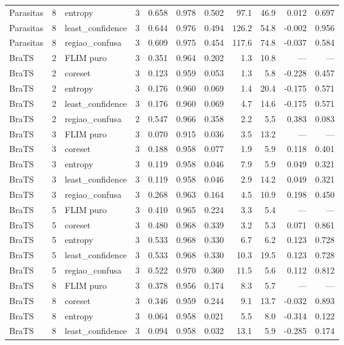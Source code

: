 \begin{tabular}{lllrrrrrrrr}
Parasitas & 8 & entropy & 3 & 0.658 & 0.978 & 0.502 & 97.1 & 46.9 & 0.012 & 0.697 \\
Parasitas & 8 & least\_confidence & 3 & 0.644 & 0.976 & 0.494 & 126.2 & 54.8 & -0.002 & 0.956 \\
Parasitas & 8 & regiao\_confusa & 3 & 0.609 & 0.975 & 0.454 & 117.6 & 74.8 & -0.037 & 0.584 \\
BraTS & 2 & FLIM puro & 3 & 0.351 & 0.964 & 0.202 & 1.3 & 10.8 & — & — \\
BraTS & 2 & coreset & 3 & 0.123 & 0.959 & 0.053 & 1.3 & 5.8 & -0.228 & 0.457 \\
BraTS & 2 & entropy & 3 & 0.176 & 0.960 & 0.069 & 1.4 & 20.4 & -0.175 & 0.571 \\
BraTS & 2 & least\_confidence & 3 & 0.176 & 0.960 & 0.069 & 4.7 & 14.6 & -0.175 & 0.571 \\
BraTS & 2 & regiao\_confusa & 2 & 0.547 & 0.966 & 0.358 & 2.2 & 5.5 & 0.383 & 0.083 \\
BraTS & 3 & FLIM puro & 3 & 0.070 & 0.915 & 0.036 & 3.5 & 13.2 & — & — \\
BraTS & 3 & coreset & 3 & 0.188 & 0.958 & 0.077 & 1.9 & 5.9 & 0.118 & 0.401 \\
BraTS & 3 & entropy & 3 & 0.119 & 0.958 & 0.046 & 7.9 & 5.9 & 0.049 & 0.321 \\
BraTS & 3 & least\_confidence & 3 & 0.119 & 0.958 & 0.046 & 2.9 & 14.2 & 0.049 & 0.321 \\
BraTS & 3 & regiao\_confusa & 3 & 0.268 & 0.963 & 0.164 & 4.5 & 10.9 & 0.198 & 0.450 \\
BraTS & 5 & FLIM puro & 3 & 0.410 & 0.965 & 0.224 & 3.3 & 5.4 & — & — \\
BraTS & 5 & coreset & 3 & 0.480 & 0.968 & 0.339 & 3.2 & 5.3 & 0.071 & 0.861 \\
BraTS & 5 & entropy & 3 & 0.533 & 0.968 & 0.330 & 6.7 & 6.2 & 0.123 & 0.728 \\
BraTS & 5 & least\_confidence & 3 & 0.533 & 0.968 & 0.330 & 10.3 & 19.5 & 0.123 & 0.728 \\
BraTS & 5 & regiao\_confusa & 3 & 0.522 & 0.970 & 0.360 & 11.5 & 5.6 & 0.112 & 0.812 \\
BraTS & 8 & FLIM puro & 3 & 0.378 & 0.956 & 0.174 & 8.3 & 5.7 & — & — \\
BraTS & 8 & coreset & 3 & 0.346 & 0.959 & 0.244 & 9.1 & 13.7 & -0.032 & 0.893 \\
BraTS & 8 & entropy & 3 & 0.064 & 0.958 & 0.021 & 5.5 & 8.0 & -0.314 & 0.122 \\
BraTS & 8 & least\_confidence & 3 & 0.094 & 0.958 & 0.032 & 13.1 & 5.9 & -0.285 & 0.174 \\

\end{tabular}
